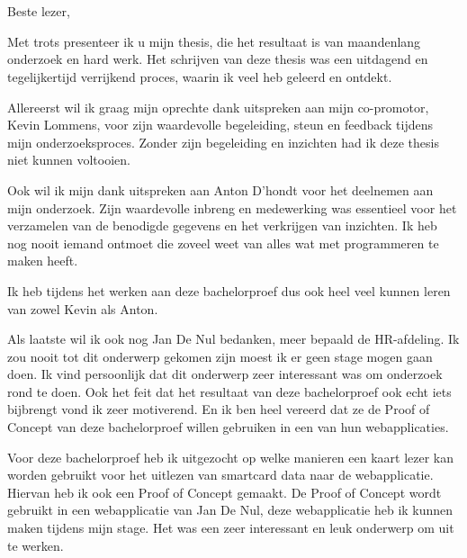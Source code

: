 
\chapter*{}%
\label{ch:voorwoord}

Beste lezer,

Met trots presenteer ik u mijn thesis, die het resultaat is van maandenlang onderzoek en hard werk. Het schrijven van deze thesis was een uitdagend en tegelijkertijd verrijkend proces, waarin ik veel heb geleerd en ontdekt.

Allereerst wil ik graag mijn oprechte dank uitspreken aan mijn co-promotor, Kevin Lommens, voor zijn waardevolle begeleiding, steun en feedback tijdens mijn onderzoeksproces. Zonder zijn begeleiding en inzichten had ik deze thesis niet kunnen voltooien.

Ook wil ik mijn dank uitspreken aan Anton D'hondt voor het deelnemen aan mijn onderzoek. Zijn waardevolle inbreng en medewerking was essentieel voor het verzamelen van de benodigde gegevens en het verkrijgen van inzichten. Ik heb nog nooit iemand ontmoet die zoveel weet van alles wat met programmeren te maken heeft.

Ik heb tijdens het werken aan deze bachelorproef dus ook heel veel kunnen leren van zowel Kevin als Anton. 

Als laatste wil ik ook nog Jan De Nul bedanken, meer bepaald de HR-afdeling. Ik zou nooit tot dit onderwerp gekomen zijn moest ik er geen stage mogen gaan doen. Ik vind persoonlijk dat dit onderwerp zeer interessant was om onderzoek rond te doen. Ook het feit dat het resultaat van deze bachelorproef ook echt iets bijbrengt vond ik zeer motiverend. En ik ben heel vereerd dat ze de Proof of Concept van deze bachelorproef willen gebruiken in een van hun webapplicaties.

Voor deze bachelorproef heb ik uitgezocht op welke manieren een kaart lezer kan worden gebruikt voor het uitlezen van smartcard data naar de webapplicatie. Hiervan heb ik ook een Proof of Concept gemaakt. De Proof of Concept wordt gebruikt in een webapplicatie van Jan De Nul, deze webapplicatie heb ik kunnen maken tijdens mijn stage. Het was een zeer interessant en leuk onderwerp om uit te werken.